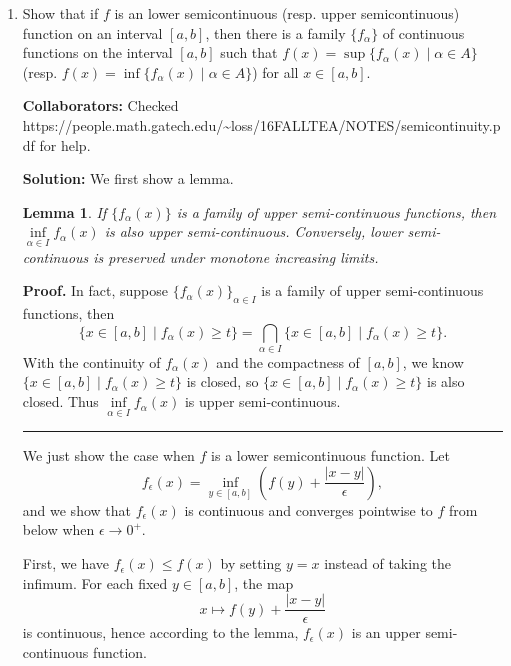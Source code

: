 \documentclass{article}%
\newtheorem{lemma}[theorem]{Lemma}
\newenvironment{proof}[1][Proof]{\textbf{#1.} }{\ \rule{0.5em}{0.5em}}
\begin{document}
\begin{enumerate}
\item Show that if $f$ is an lower semicontinuous (resp. upper semicontinuous) function on an interval $[a,b]$, then there is a family $\{f_{\alpha}\}$ of continuous functions on the interval $[a,b]$ such that $f(x) = \sup\{f_{\alpha}(x) \mid \alpha \in A \}$ (resp. $f(x) = \inf\{f_{\alpha}(x) \mid \alpha \in A \}$) for all $x \in [a,b]$.  


\bigskip
\textbf{Collaborators:} Checked https://people.math.gatech.edu/\~{}loss/16FALLTEA/NOTES/semicontinuity.pdf for help.
\smallskip
 
\textbf{Solution:}
We first show a lemma.
\begin{lemma}
If $\{f_\alpha(x)\}$ is a family of upper semi-continuous functions, then $\inf\limits_{\alpha\in I}f_\alpha(x)$ is also upper semi-continuous. Conversely, lower semi-continuous is preserved under monotone increasing limits.
\end{lemma}
\begin{proof}
In fact, suppose $\{f_\alpha(x)\}_{\alpha\in I}$ is a family of upper semi-continuous functions, then 
$$
\{x\in [a, b]\mid f_\alpha(x)\ge t\} = \bigcap_{\alpha\in I}\{x\in [a, b]\mid f_\alpha(x)\ge t\}.
$$
With the continuity of $f_\alpha(x)$ and the compactness of $[a, b]$, we know $\{x\in [a, b]\mid f_\alpha(x) \ge t\}$ is closed, so $\{x\in [a, b]\mid f_\alpha(x)\ge t\}$ is also closed. Thus $\inf\limits_{\alpha\in I} f_\alpha(x)$ is upper semi-continuous.
\end{proof}

We just show the case when $f$ is a lower semicontinuous function. Let
$$ 
f_\epsilon(x) = \inf_{y\in [a, b]}\left(f(y) + \frac{|x-y|}{\epsilon}\right),
$$
and we show that $f_\epsilon(x) $ is continuous and converges pointwise to $f$ from below when $\epsilon \to 0^+$.

First, we have $f_\epsilon(x) \le f(x)$ by setting $y = x$ instead of taking the infimum. For each fixed $y\in [a, b]$, the map
$$
x \mapsto f(y)+\frac{|x-y|}{\epsilon}
$$
is continuous, hence according to the lemma, $f_{\epsilon}(x)$ is an upper semi-continuous function.


\end{enumerate}
\end{document}

